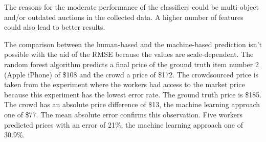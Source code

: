 The reasons for the moderate performance of the classifiers could be multi-object and/or outdated auctions in the collected data. A higher number of features could also lead to better results.

The comparison between the human-based and the machine-based prediction isn't possible with the aid of the RMSE because the values are scale-dependent. The random forest algorithm predicts a final price of the ground truth item number 2 (Apple iPhone) of \$108 and the crowd a price of \$172. The crowdsourced price is taken from the experiment where the workers had access to the market price because this experiment has the lowest error rate. The ground truth price is \$185. The crowd has an absolute price difference of \$13, the machine learning approach one of \$77. The mean absolute error confirms this observation. Five workers predicted prices with an error of 21\%, the machine learning approach one of 30.9\%.

